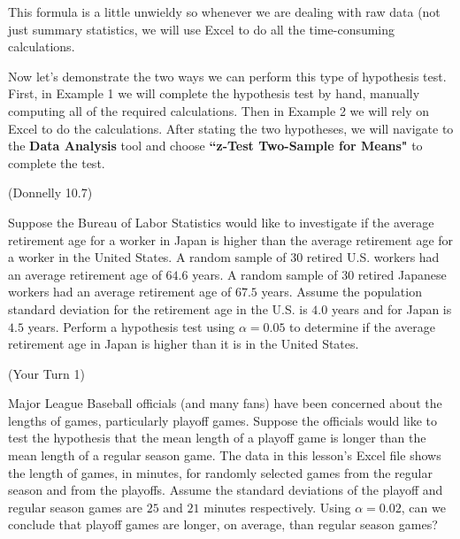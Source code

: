 \documentclass[12pt, letterpaper]{article}
\newcounter{exercise}
\theoremstyle{definition}
\begin{document}
\newpage

\noindent This formula is a little unwieldy so whenever we are dealing with raw data (not just summary statistics, we will use Excel to do all the time-consuming calculations.

\vspace*{.1in}

\noindent Now let's demonstrate the two ways we can perform this type of hypothesis test.  First, in Example 1 we will complete the hypothesis test by hand, manually computing all of the required calculations.  Then in Example 2 we will rely on Excel to do the calculations.  After stating the two hypotheses, we will navigate to the \textbf{Data Analysis} tool and choose \textbf{``z-Test Two-Sample for Means"} to complete the test.

\begin{exercise}  (Donnelly 10.7)

Suppose the Bureau of Labor Statistics would like to investigate if the average retirement age for a worker in Japan is higher than the average retirement age for a worker in the United States.  A random sample of $30$ retired U.S. workers had an average retirement age of $64.6$ years.  A random sample of $30$ retired Japanese workers had an average retirement age of $67.5$ years.  Assume the population standard deviation for the retirement age in the U.S. is $4.0$ years and for Japan is $4.5$ years.  Perform a hypothesis test using $\alpha=0.05$ to determine if the average retirement age in Japan is higher than it is in the United States.

\end{exercise}

\vfill  

\newpage

\begin{exercise}  (Your Turn 1)

Major League Baseball officials (and many fans) have been concerned about the lengths of games, particularly playoff games.  Suppose the officials would like to test the hypothesis that the mean length of a playoff game is longer than the mean length of a regular season game.  The data in this lesson's Excel file shows the length of games, in minutes, for randomly selected games from the regular season and from the playoffs.  Assume the standard deviations of the playoff and regular season games are $25$ and $21$ minutes respectively.  Using $\alpha = 0.02$, can we conclude that playoff games are longer, on average, than regular season games?

\end{exercise}
\end{document}

